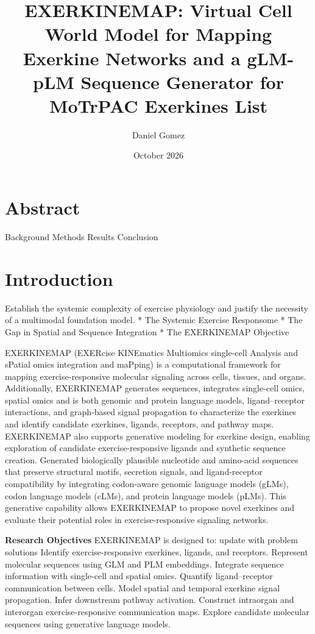 \documentclass[11pt]{article}
\title{EXERKINEMAP: Virtual Cell World Model for Mapping Exerkine Networks and a gLM-pLM Sequence Generator for MoTrPAC Exerkines List}
\author{Daniel Gomez}
\date{October 2026}
\begin{document}
\maketitle

\section{Abstract}
Background
Methods
Results
Conclusion
\section{Introduction}
Establish the systemic complexity of exercise physiology and justify the necessity of a multimodal foundation model. \newline
* The Systemic Exercise Responsome \newline
* The Gap in Spatial and Sequence Integration \newline
* The EXERKINEMAP Objective \newline

EXERKINEMAP (EXERcise KINEmatics Multiomics single-cell Analysis and sPatial omics integration and maPping) is a computational framework for mapping exercise-responsive molecular signaling across cells, tissues, and organs. Additionally, EXERKINEMAP generates sequences, integrates single-cell omics, spatial omics and is both genomic and protein language models, ligand–receptor interactions, and graph-based signal propagation to characterize the exerkines and identify candidate exerkines, ligands, receptors, and pathway maps. EXERKINEMAP also supports generative modeling for exerkine design, enabling exploration of candidate exercise-responsive ligands and synthetic sequence creation. Generated biologically plausible nucleotide and amino-acid sequences that preserve structural motifs, secretion signals, and ligand-receptor compatibility by integrating codon-aware genomic language models (gLMs), codon language models (cLMs), and protein language models (pLMs). This generative capability allows EXERKINEMAP to propose novel exerkines and evaluate their potential roles in exercise-responsive signaling networks.

\textbf{Research Objectives} \newline
EXERKINEMAP is designed to:
update with problem solutions 
Identify exercise-responsive exerkines, ligands, and receptors.
Represent molecular sequences using GLM and PLM embeddings.
Integrate sequence information with single-cell and spatial omics.
Quantify ligand–receptor communication between cells.
Model spatial and temporal exerkine signal propagation.
Infer downstream pathway activation.
Construct intraorgan and interorgan exercise-responsive communication maps.
Explore candidate molecular sequences using generative language models.
\end{document}

